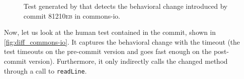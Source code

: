 \begin{figure}[h]
\centering
{}
\caption{Test generated by \DCII that detects the behavioral change introduced by commit \textsc{81210eb} in commons-io.}
\label{fig:ampl_commons-io}
\end{figure}

Now, let us look at the human test contained in the commit, shown in \autoref{fig:diff_commons-io}.
It captures the behavioral change with the timeout (the test timeouts on the pre-commit version and goes fast enough on the post-commit version). 
Furthermore, it only indirectly calls the changed method through a call to \texttt{readLine}.

